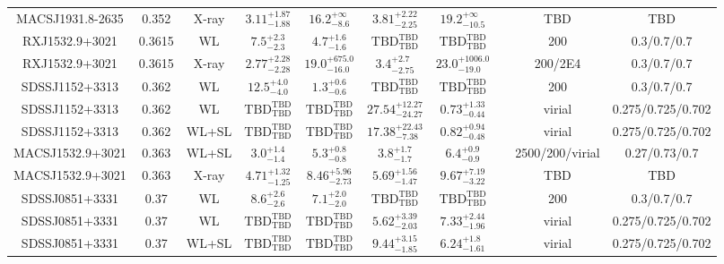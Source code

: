 \begin{table}
\begin{tabular}{cccccccccc}
MACSJ1931.8-2635 & 0.352 & X-ray & ${3.11}^{+1.87}_{-1.88}$ & ${16.2}^{+\infty}_{-8.6}$ & ${3.81}^{+2.22}_{-2.25}$ & ${19.2}^{+\infty}_{-10.5}$ & \citet{SC06.1} & TBD & TBD \\
RXJ1532.9+3021 & 0.3615 & WL & ${7.5}^{+2.3}_{-2.3}$ & ${4.7}^{+1.6}_{-1.6}$ & ${\mathrm{TBD}}^{\mathrm{TBD}}_{\mathrm{TBD}}$ & ${\mathrm{TBD}}^{\mathrm{TBD}}_{\mathrm{TBD}}$ & \citet{SE14.1} & 200 & 0.3/0.7/0.7 \\
RXJ1532.9+3021 & 0.3615 & X-ray & ${2.77}^{+2.28}_{-2.28}$ & ${19.0}^{+675.0}_{-16.0}$ & ${3.4}^{+2.7}_{-2.75}$ & ${23.0}^{+1006.0}_{-19.0}$ & \citet{VO06.1} & 200/2E4 & 0.3/0.7/0.7 \\
SDSSJ1152+3313 & 0.362 & WL & ${12.5}^{+4.0}_{-4.0}$ & ${1.3}^{+0.6}_{-0.6}$ & ${\mathrm{TBD}}^{\mathrm{TBD}}_{\mathrm{TBD}}$ & ${\mathrm{TBD}}^{\mathrm{TBD}}_{\mathrm{TBD}}$ & \citet{SE14.1} & 200 & 0.3/0.7/0.7 \\
SDSSJ1152+3313 & 0.362 & WL & ${\mathrm{TBD}}^{\mathrm{TBD}}_{\mathrm{TBD}}$ & ${\mathrm{TBD}}^{\mathrm{TBD}}_{\mathrm{TBD}}$ & ${27.54}^{+12.27}_{-24.27}$ & ${0.73}^{+1.33}_{-0.44}$ & \citet{OG12.1} & virial & 0.275/0.725/0.702 \\
SDSSJ1152+3313 & 0.362 & WL+SL & ${\mathrm{TBD}}^{\mathrm{TBD}}_{\mathrm{TBD}}$ & ${\mathrm{TBD}}^{\mathrm{TBD}}_{\mathrm{TBD}}$ & ${17.38}^{+22.43}_{-7.38}$ & ${0.82}^{+0.94}_{-0.48}$ & \citet{OG12.1} & virial & 0.275/0.725/0.702 \\
MACSJ1532.9+3021 & 0.363 & WL+SL & ${3.0}^{+1.4}_{-1.4}$ & ${5.3}^{+0.8}_{-0.8}$ & ${3.8}^{+1.7}_{-1.7}$ & ${6.4}^{+0.9}_{-0.9}$ & \citet{ME14.1} & 2500/200/virial & 0.27/0.73/0.7 \\
MACSJ1532.9+3021 & 0.363 & X-ray & ${4.71}^{+1.32}_{-1.25}$ & ${8.46}^{+5.96}_{-2.73}$ & ${5.69}^{+1.56}_{-1.47}$ & ${9.67}^{+7.19}_{-3.22}$ & \citet{SC06.1} & TBD & TBD \\
SDSSJ0851+3331 & 0.37 & WL & ${8.6}^{+2.6}_{-2.6}$ & ${7.1}^{+2.0}_{-2.0}$ & ${\mathrm{TBD}}^{\mathrm{TBD}}_{\mathrm{TBD}}$ & ${\mathrm{TBD}}^{\mathrm{TBD}}_{\mathrm{TBD}}$ & \citet{SE14.1} & 200 & 0.3/0.7/0.7 \\
SDSSJ0851+3331 & 0.37 & WL & ${\mathrm{TBD}}^{\mathrm{TBD}}_{\mathrm{TBD}}$ & ${\mathrm{TBD}}^{\mathrm{TBD}}_{\mathrm{TBD}}$ & ${5.62}^{+3.39}_{-2.03}$ & ${7.33}^{+2.44}_{-1.96}$ & \citet{OG12.1} & virial & 0.275/0.725/0.702 \\
SDSSJ0851+3331 & 0.37 & WL+SL & ${\mathrm{TBD}}^{\mathrm{TBD}}_{\mathrm{TBD}}$ & ${\mathrm{TBD}}^{\mathrm{TBD}}_{\mathrm{TBD}}$ & ${9.44}^{+3.15}_{-1.85}$ & ${6.24}^{+1.8}_{-1.61}$ & \citet{OG12.1} & virial & 0.275/0.725/0.702 \\

\end{tabular}
\end{table}

